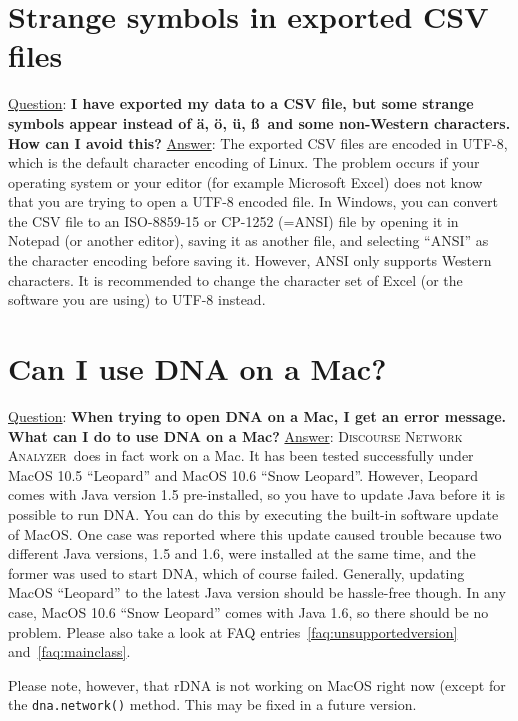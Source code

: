 \documentclass[12pt,a4paper]{scrreprt}
\newcommand{\dnalong}{\textsc{Discourse} \textsc{Network} \textsc{Analyzer}}
\newcommand{\dnashort}{\textsc{DNA}}
\newcommand{\code}[1]{\texttt{#1}}
\begin{document}
\section{Strange symbols in exported CSV files}
\underline{Question}: \textbf{I have exported my data to a CSV file, but some strange symbols appear instead of \"a, \"o, \"u, \ss\ and some non-Western characters. How can I avoid this?}
\vspace{0.3cm} \newline
\underline{Answer}: The exported CSV files are encoded in UTF-8, which is the default character encoding of Linux. The problem occurs if your operating system or your editor (for example Microsoft Excel) does not know that you are trying to open a UTF-8 encoded file. In Windows, you can convert the CSV file to an ISO-8859-15 or CP-1252 (=ANSI) file by opening it in Notepad (or another editor), saving it as another file, and selecting ``ANSI'' as the character encoding before saving it. However, ANSI only supports Western characters. It is recommended to change the character set of Excel (or the software you are using) to UTF-8 instead.

\section{Can I use DNA on a Mac?}
\underline{Question}: \textbf{When trying to open DNA on a Mac, I get an error message. What can I do to use DNA on a Mac?}
\vspace{0.3cm} \newline
\underline{Answer}: \dnalong\ does in fact work on a Mac. It has been tested successfully under MacOS 10.5 ``Leopard'' and MacOS 10.6 ``Snow Leopard''. However, Leopard comes with Java version 1.5 pre-installed, so you have to update Java before it is possible to run \dnashort. You can do this by executing the built-in software update of MacOS. One case was reported where this update caused trouble because two different Java versions, 1.5 and 1.6, were installed at the same time, and the former was used to start \dnashort, which of course failed. Generally, updating MacOS ``Leopard'' to the latest Java version should be hassle-free though. In any case, MacOS 10.6 ``Snow Leopard'' comes with Java 1.6, so there should be no problem. Please also take a look at FAQ entries~\ref{faq:unsupportedversion} and~\ref{faq:mainclass}.

Please note, however, that rDNA is not working on MacOS right now (except for the \code{dna.network()} method. This may be fixed in a future version.
\end{document}
